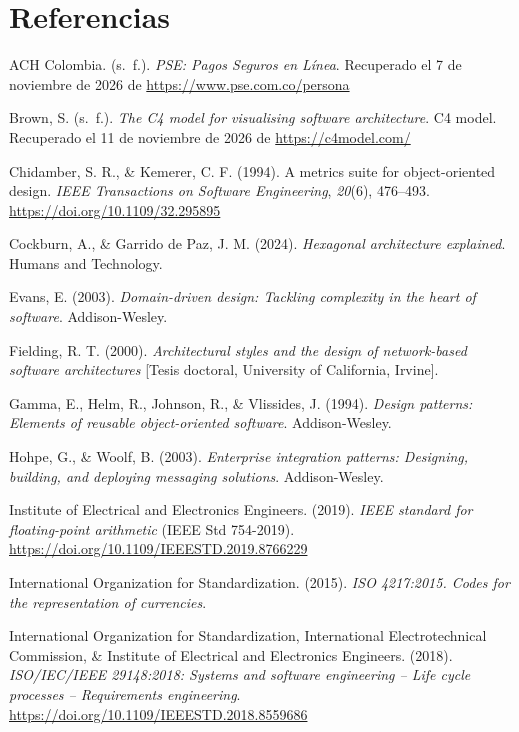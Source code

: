 \section{Referencias}

\begingroup\sloppy
\setlength{\parindent}{-1.5em}
\setlength{\leftskip}{1.5em}
\setlength{\parskip}{0.6em}

\noindent ACH Colombia. (s.~f.). \textit{PSE: Pagos Seguros en Línea}. Recuperado el 7 de noviembre de 2026 de \url{https://www.pse.com.co/persona}

\noindent Brown, S. (s.~f.). \textit{The C4 model for visualising software architecture}. C4 model. Recuperado el 11 de noviembre de 2026 de \url{https://c4model.com/}

\noindent Chidamber, S. R., \& Kemerer, C. F. (1994). A metrics suite for object-oriented design. \textit{IEEE Transactions on Software Engineering}, \textit{20}(6), 476--493. \url{https://doi.org/10.1109/32.295895}

\noindent Cockburn, A., \& Garrido de Paz, J. M. (2024). \textit{Hexagonal architecture explained}. Humans and Technology.

\noindent Evans, E. (2003). \textit{Domain-driven design: Tackling complexity in the heart of software}. Addison-Wesley.

\noindent Fielding, R. T. (2000). \textit{Architectural styles and the design of network-based software architectures} [Tesis doctoral, University of California, Irvine].

\noindent Gamma, E., Helm, R., Johnson, R., \& Vlissides, J. (1994). \textit{Design patterns: Elements of reusable object-oriented software}. Addison-Wesley.

\noindent Hohpe, G., \& Woolf, B. (2003). \textit{Enterprise integration patterns: Designing, building, and deploying messaging solutions}. Addison-Wesley.

\noindent Institute of Electrical and Electronics Engineers. (2019). \textit{IEEE standard for floating-point arithmetic} (IEEE Std 754-2019). \url{https://doi.org/10.1109/IEEESTD.2019.8766229}

\noindent International Organization for Standardization. (2015). \textit{ISO 4217:2015. Codes for the representation of currencies}.

\noindent International Organization for Standardization, International Electrotechnical Commission, \& Institute of Electrical and Electronics Engineers. (2018). \textit{ISO/IEC/IEEE 29148:2018: Systems and software engineering -- Life cycle processes -- Requirements engineering}. \url{https://doi.org/10.1109/IEEESTD.2018.8559686}

